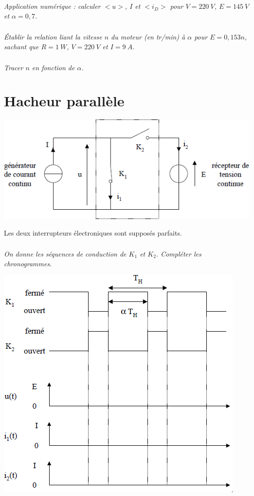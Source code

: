 \documentclass[10pt,fleqn]{article} %
\begin{document}
\begin{multicols}{2}
\begin{multicols}{2}
\subparagraph{}\textit{ Application numérique : calculer $< u >$, $I$ et $< i_D >$ pour $V = \SI{220}{V}$, $E = \SI{145}{V}$ et $\alpha = 0,7$.}

\subparagraph{}\textit{ Établir la relation liant la vitesse $n$ du moteur (en tr/min) à $\alpha$ pour $E = 0,153 n$, sachant que $R = \SI{1}{W}$, $V = \SI{220}{V}$ et $I =\SI{9}{A}$.}
\subparagraph{}\textit{ Tracer $n$ en fonction de $\alpha$.}

\newpage

\section*{Hacheur parallèle}
\setcounter{exo}{0}

\begin{center}
\includegraphics[width=\linewidth]{images/fig_05}
\end{center}
Les deux interrupteurs électroniques sont supposés parfaits.


\subparagraph{}\textit{On donne les séquences de conduction de $K_1$ et $K_2$. Compléter les chronogrammes.}
\ifprof
\begin{corrige}
\end{corrige}
\else
\fi

\begin{center}
\includegraphics[width=\linewidth]{images/fig_06}
\end{center}


\end{multicols}
\end{multicols}
\end{document}
